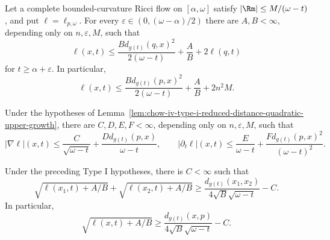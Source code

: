 \begin{lemma}
\label{lem:chow-iv-type-i-reduced-distance-quadratic-upper-growth}
Let a complete bounded-curvature Ricci flow on \([\alpha,\omega]\) satisfy
\(|\Rm|\leq M/(\omega-t)\), and put \(\ell=\ell_{p,\omega}\).  For every
\(\varepsilon\in(0,(\omega-\alpha)/2)\) there are \(A,B<\infty\), depending
only on \(n,\varepsilon,M\), such that
\[
 \ell(x,t)\leq
 \frac{B d_{g(t)}(q,x)^2}{2(\omega-t)}+\frac AB+2\ell(q,t)
\]
for \(t\geq\alpha+\varepsilon\).  In particular,
\[
 \ell(x,t)\leq
 \frac{B d_{g(t)}(p,x)^2}{2(\omega-t)}+\frac AB+2n^2M.
\]
\end{lemma}

\begin{corollary}
\label{cor:chow-iv-type-i-reduced-distance-derivative-bounds}
Under the hypotheses of
Lemma~\ref{lem:chow-iv-type-i-reduced-distance-quadratic-upper-growth}, there
are \(C,D,E,F<\infty\), depending only on \(n,\varepsilon,M\), such that
\[
 |\nabla\ell|(x,t)\leq \frac C{\sqrt{\omega-t}}
 +\frac{D d_{g(t)}(p,x)}{\omega-t},
\qquad
 |\partial_t\ell|(x,t)\leq\frac E{\omega-t}
 +\frac{F d_{g(t)}(p,x)^2}{(\omega-t)^2}.
\]
\end{corollary}

\begin{lemma}
\label{lem:chow-iv-type-i-reduced-distance-lower-bound}
Under the preceding Type I hypotheses, there is \(C<\infty\) such that
\[
 \sqrt{\ell(x_1,t)+A/B}+\sqrt{\ell(x_2,t)+A/B}
 \geq \frac{d_{g(t)}(x_1,x_2)}{4\sqrt B\sqrt{\omega-t}}-C.
\]
In particular,
\[
 \sqrt{\ell(x,t)+A/B}
 \geq\frac{d_{g(t)}(x,p)}{4\sqrt B\sqrt{\omega-t}}-C.
\]
\end{lemma}

